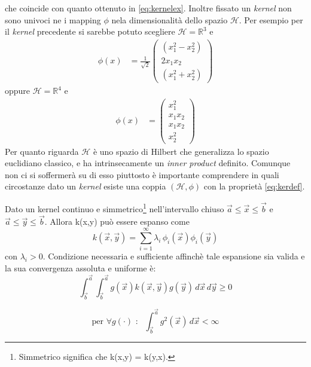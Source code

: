 che coincide con quanto ottenuto in \eqref{eq:kernelex}. Inoltre fissato un \textit{kernel} non sono univoci ne i mapping $\phi$ nela dimensionalità dello spazio $\mathcal{H}$. Per esempio per il \textit{kernel} precedente si sarebbe potuto scegliere $\mathcal{H} = \mathbb{R}^3$ e 
 \begin{align*}
    \phi(x) &= \frac{1}{\sqrt{2}}\begin{pmatrix}
           (x_{1}^2 - x_{2}^2)\\
           2x_{1}x_{2} \\
           (x_{1}^2 + x_{2}^2)
         \end{pmatrix}
  \end{align*}
  oppure $\mathcal{H} = \mathbb{R}^4$ e
  \begin{align*}
    \phi(x) &= \begin{pmatrix}
           x_{1}^2\\
           x_{1}x_{2} \\
           x_{1}x_{2} \\
           x_{2}^2
         \end{pmatrix}
  \end{align*}
Per quanto riguarda $\mathcal{H}$ è uno spazio di Hilbert che generalizza lo spazio euclidiano classico, e ha intrinsecamente un \textit{inner product} definito. Comunque non ci si soffermerà su di esso piuttosto è importante comprendere in quali circostanze dato un \textit{kernel} esiste una coppia $(\mathcal{H} , \phi)$ con la proprietà \eqref{eq:kerdef}.
\begin{teorema}Dato un kernel continuo e simmetrico\footnote{Simmetrico significa che k(x,y) = k(y,x).} nell'intervallo chiuso    $\overrightarrow{a} \leq \overrightarrow{x} \leq \overrightarrow{b}$ e $\overrightarrow{a} \leq \overrightarrow{y} \leq \overrightarrow{b}$. Allora k(x,y) può essere espanso come
\begin{equation}
k(\overrightarrow{x},\overrightarrow{y}) = \sum_{i=1}^{\infty}\lambda_i\,\phi_i(\overrightarrow{x})\phi_i(\overrightarrow{y})
\end{equation}
con $\lambda_i > 0$. Condizione necessaria e sufficiente affinchè tale espansione sia valida e la sua convergenza assoluta e uniforme è:
\begin{equation*}
\int_{\overrightarrow{b}}^{\overrightarrow{a}}\int_{\overrightarrow{b}}^{\overrightarrow{a}} g(\overrightarrow{x})k(\overrightarrow{x},\overrightarrow{y})g(\overrightarrow{y})\,d\overrightarrow{x}\,d\overrightarrow{y} \geq 0
\end{equation*}

\begin{equation*}
\text{per } \forall g(\cdot) \text{ : } \:\:\int_{\overrightarrow{b}}^{\overrightarrow{a}}g^2(\overrightarrow{x})\,d\overrightarrow{x} < \infty
\end{equation*}
\end{teorema}


